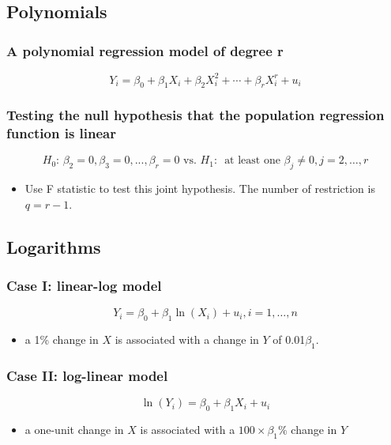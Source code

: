 \documentclass[a4paper,10pt]{article}
\begin{document}
\subsection{Polynomials}
\label{sec:org13cf77e}
\subsubsection*{A polynomial regression model of degree r}
\label{sec:orge00e8fc}
\begin{equation}
\label{eq:poly-r}
Y_i = \beta_0 + \beta_1 X_i + \beta_2 X_i^2 + \cdots + \beta_r X_i^r + u_i
\end{equation}

\subsubsection*{Testing the null hypothesis that the population regression function is linear}
\label{sec:org03f050a}
\[ H_0:\, \beta_2 = 0, \beta_3 = 0, ..., \beta_r = 0 \text{ vs. }
H_1:\, \text{ at least one } \beta_j \neq 0, j = 2, \ldots, r \]
\begin{itemize}
\item Use F statistic to test this joint hypothesis. The number of
restriction is \(q = r-1\).
\end{itemize}

\subsection{Logarithms}
\label{sec:orgfbab5c6}
\subsubsection*{Case I: linear-log model}
\label{sec:orgf414eec}
\begin{equation}
\label{eq:linear-log}
Y_i = \beta_0 + \beta_1 \ln(X_i) + u_i, i = 1, \ldots, n
\end{equation}
\begin{itemize}
\item a 1\% change in \(X\) is associated with a change in \(Y\) of
0.01\(\beta_{\text{1}}\).
\end{itemize}

\subsubsection*{Case II: log-linear model}
\label{sec:orge3f961d}
\begin{equation}
\label{eq:log-linear}
\ln(Y_i) = \beta_0 + \beta_1 X_i + u_i
\end{equation}
\begin{itemize}
\item a one-unit change in \(X\) is associated with a \(100 \times \beta_1\%\)
change in \(Y\)
\end{itemize}
\end{document}
